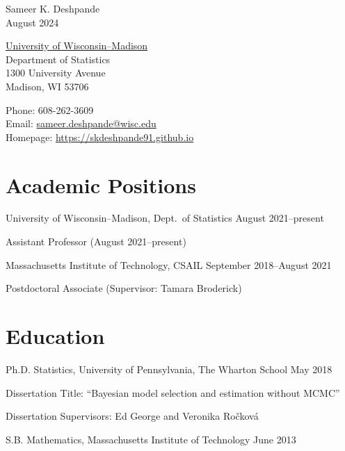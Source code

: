 \documentclass[10pt]{article}
\renewenvironment{itemize}{
  \begin{list}{}{
    \setlength{\leftmargin}{1.5em}
  }
}{
  \end{list}
}
\begin{document}
\begin{center}
{ \Large Sameer K. Deshpande } \\
August 2024
\end{center}

\begin{minipage}{0.4\linewidth}
  \href{http://www.wisc.edu}{University of Wisconsin--Madison} \\
  Department of Statistics \\
  1300 University Avenue \\
  Madison, WI 53706
\end{minipage}
\hfill
\begin{minipage}{0.42\linewidth}
Phone: 608-262-3609 \\
Email: \url{sameer.deshpande@wisc.edu} \\
Homepage: \url{https://skdeshpande91.github.io}
\end{minipage}

\section*{Academic Positions}
\begin{itemize}
\item{University of Wisconsin--Madison, Dept.\ of Statistics \hfill August 2021--present}
\begin{itemize}
\item{Assistant Professor (August 2021--present)}
\end{itemize}
\item{Massachusetts Institute of Technology, CSAIL \hfill September 2018--August 2021}
\begin{itemize}
\item{Postdoctoral Associate (Supervisor: Tamara Broderick)}
\end{itemize}
\end{itemize}

\section*{Education}
\begin{itemize}
\item{Ph.D. Statistics, University of Pennsylvania, The Wharton School \hfill May 2018}
\begin{itemize}
\item{Dissertation Title: ``Bayesian model selection and estimation without MCMC''}
\item{Dissertation Supervisors: Ed George and Veronika Ro\v{c}kov\'{a}}
\end{itemize}
\item{S.B. Mathematics, Massachusetts Institute of Technology \hfill June 2013}
\end{itemize}
\end{document}
